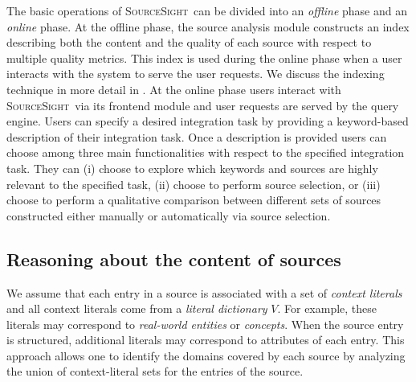 \documentclass{vldb}
\newcommand\system{\textsc{SourceSight}}
\begin{document}
The basic operations of \system~can be divided into an {\em offline} phase and an {\em online} phase. At the offline phase, the source analysis module constructs an index describing both the content and the quality of each source with respect to multiple quality metrics. This index is used during the online phase when a user interacts with the system to serve the user requests. We discuss the indexing technique in more detail in . At the online phase users interact with \system~via its frontend module and user requests are served by the query engine. Users can specify a desired integration task by providing a keyword-based description of their integration task. Once a description is provided users can choose among three main functionalities with respect to the specified integration task. They can (i) choose to explore which keywords and sources are highly relevant to the specified task, (ii) choose to perform source selection, or (iii) choose to perform a qualitative comparison between different sets of sources constructed either manually or automatically via source selection. %

\subsection{Reasoning about the content of sources}
\label{sec:reasoning}
We assume that each entry in a source is associated with a set of {\em context literals} and all context literals come from a {\em literal dictionary} $V$. For example, these literals may correspond to {\em real-world entities} or {\em concepts}. When the source entry is structured, additional literals may correspond to attributes of each entry. This approach allows one to identify the domains covered by each source by analyzing the union of context-literal sets for the entries of the source. 
\end{document}
